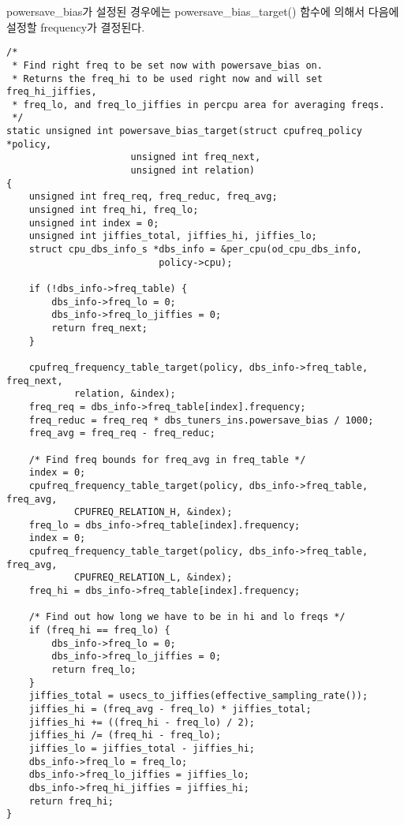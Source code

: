 powersave\_bias가 설정된 경우에는 powersave\_bias\_target() 함수에 의해서 다음에 설정할 frequency가 결정된다.
\begin{lstlisting}
/*
 * Find right freq to be set now with powersave_bias on.
 * Returns the freq_hi to be used right now and will set freq_hi_jiffies,
 * freq_lo, and freq_lo_jiffies in percpu area for averaging freqs.
 */
static unsigned int powersave_bias_target(struct cpufreq_policy *policy,
                      unsigned int freq_next,
                      unsigned int relation)
{
    unsigned int freq_req, freq_reduc, freq_avg;
    unsigned int freq_hi, freq_lo;
    unsigned int index = 0;
    unsigned int jiffies_total, jiffies_hi, jiffies_lo;
    struct cpu_dbs_info_s *dbs_info = &per_cpu(od_cpu_dbs_info,
                           policy->cpu);

    if (!dbs_info->freq_table) {
        dbs_info->freq_lo = 0;
        dbs_info->freq_lo_jiffies = 0;
        return freq_next;
    }

    cpufreq_frequency_table_target(policy, dbs_info->freq_table, freq_next,
            relation, &index);
    freq_req = dbs_info->freq_table[index].frequency;
    freq_reduc = freq_req * dbs_tuners_ins.powersave_bias / 1000;
    freq_avg = freq_req - freq_reduc;

    /* Find freq bounds for freq_avg in freq_table */
    index = 0;
    cpufreq_frequency_table_target(policy, dbs_info->freq_table, freq_avg,
            CPUFREQ_RELATION_H, &index);
    freq_lo = dbs_info->freq_table[index].frequency;
    index = 0;
    cpufreq_frequency_table_target(policy, dbs_info->freq_table, freq_avg,
            CPUFREQ_RELATION_L, &index);
    freq_hi = dbs_info->freq_table[index].frequency;

    /* Find out how long we have to be in hi and lo freqs */
    if (freq_hi == freq_lo) {
        dbs_info->freq_lo = 0;
        dbs_info->freq_lo_jiffies = 0;
        return freq_lo;
    }
    jiffies_total = usecs_to_jiffies(effective_sampling_rate());
    jiffies_hi = (freq_avg - freq_lo) * jiffies_total;
    jiffies_hi += ((freq_hi - freq_lo) / 2);
    jiffies_hi /= (freq_hi - freq_lo);
    jiffies_lo = jiffies_total - jiffies_hi;
    dbs_info->freq_lo = freq_lo;
    dbs_info->freq_lo_jiffies = jiffies_lo;
    dbs_info->freq_hi_jiffies = jiffies_hi;
    return freq_hi;
}
\end{lstlisting}


